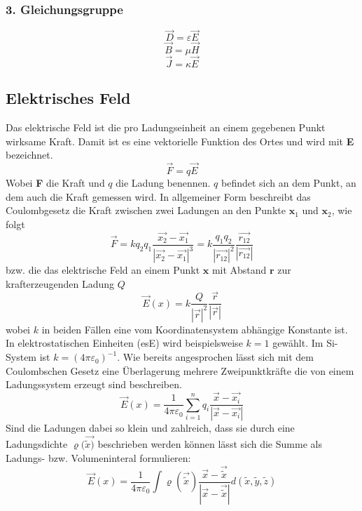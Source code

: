 \documentclass[12pt,a4paper]{report}%
\numberwithin{equation}{section}
\numberwithin{equation}{section}
\begin{document}
			\subsubsection{3. Gleichungsgruppe}
			\begin{equation}
				\vec{D} = \varepsilon \vec{E} \label{eq:mx_mat_d}
			\end{equation}
			\begin{equation}
				\vec{B} = \mu \vec{H}		\label{eq:mx_mat_b}		
			\end{equation}
			\begin{equation}
				\vec{J} = \kappa	\vec{E} \label{eq:mx_mat_j}
			\end{equation}
								
		\subsection{Elektrisches Feld}
		Das elektrische Feld ist die pro Ladungseinheit an einem gegebenen Punkt wirksame Kraft. Damit ist es eine vektorielle Funktion des Ortes und wird mit \textbf{E} bezeichnet. 
		\begin{equation}
			\vec{F} = q\vec{E}
		\end{equation}
		Wobei \textbf{F} die Kraft und $q$ die Ladung benennen. $q$ befindet sich an dem Punkt, an dem auch die Kraft gemessen wird. 
		In allgemeiner Form beschreibt das Coulombgesetz die Kraft zwischen zwei Ladungen an den Punkte $\textbf{x}_1$ und $\textbf{x}_2$,  wie folgt
		\begin{equation}
			\vec{F} = k q_2 q_1 \frac{\vec{x_2} - \vec{x_1}}{|\vec{x_2} - \vec{x_1}|^3} =  k \frac{q_1 q_2}{|\vec{r_{12}}|^2} \frac{\vec{r_{12}}}{|\vec{r_{12}}|}
		\end{equation}
		bzw. die das elektrische Feld an einem Punkt $\textbf{x}$ mit Abstand $\textbf{r}$ zur krafterzeugenden Ladung $Q$
		\begin{equation}
			\vec{E}(x) = k \frac{Q}{|\vec{r}|^2} \frac{\vec{r}}{|\vec{r}|}
		\end{equation}
		wobei $k$ in beiden Fällen eine vom Koordinatensystem abhängige Konstante ist. In elektrostatischen Einheiten (esE) wird beispielsweise $k=1$ gewählt. Im Si-System ist $k = (4 \pi  \varepsilon_0)^{-1}$.  \newline
		Wie bereits angesprochen lässt sich mit dem Coulombschen Gesetz eine Überlagerung mehrere Zweipunktkräfte die von einem Ladungssystem erzeugt sind beschreiben.
		\begin{equation}
			\vec{E}(x) = \frac{1}{4 \pi \varepsilon_0} \sum\limits_{i=1}^n q_i \frac{\vec{x} - \vec{x_i}}{|\vec{x} - \vec{x_i}|}
		\end{equation}
		Sind die Ladungen dabei so klein und zahlreich, dass sie durch eine Ladungsdichte $\varrho(\vec{\tilde{x})}$ beschrieben werden können lässt sich die Summe als Ladungs- bzw. Volumeninteral formulieren:
		\begin{equation}
			\vec{E}(x) = \frac{1}{4 \pi \varepsilon_0} \int \varrho(\vec{\tilde{x}})  \frac{\vec{x} - \vec{\tilde{x}}}{|\vec{x} - \vec{\tilde{x}}|} d(\tilde{x}, \tilde{y}, \tilde{z})
		\end{equation}
		
\end{document}
